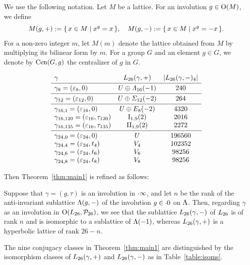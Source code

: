 \documentclass{amsart} %
\begin{document}
\par
%
We use the following notation.
Let $M$ be a lattice.
For an involution $g\in \mathord{\mathrm{O}}(M)$, we define
%
\begin{equation}\label{eq:Mgpm}
M(g, +):=\{\,{x\in M}\mid {x^g=x} \,\},
\quad
M(g, -):=\{\,{x\in M}\mid {x^g=-x} \,\}.
\end{equation}
%
For a non-zero integer $m$,
let $M(m)$ denote the lattice obtained from $M$ by multiplying its bilinear form by
$m$.
For a group $G$ and an element $g\in G$,
we denote by $\mathrm{Cen}(G, g)$ the centralizer of $g$ in $G$.
%
%
\begin{table}
\[
\begin{array}{lc c }
\gamma & \Lts(\gamma, +) & |\Lts(\gamma, -)_4|
\mystrutd{5pt} \\
\hline 
\gamma_{8}=(\vep_8, 0) & U\oplus \Lamsxtn(-1) & 240
\mystruthd{10pt}{5pt} \\
\hline
\gamma_{12}=(\vep_{12}, 0) & U\oplus \Sigmatwlv(-2) & 264
\mystruthd{10pt}{5pt} \\
\hline
\mystruth{10pt}
\gamma_{16, 1}=(\vep_{16}, 0) &U\oplus E_8(-2) &4320\\
\gamma_{16, 120} =(\vep_{16},\tauI) & \typeILat_{1, 9}(2) &2016\\
\gamma_{16, 135} =(\vep_{16},\tauII) & \typeIILat_{1, 9}(2) &2272
\mystrutd{5pt}\\
\hline
\mystruth{10pt}
\gamma_{24, 0}=( \vep_{24}, 0)& U &196560\\
\gamma_{24, 4}=(\vep_{24},t_4)& V_{4} & 102352 \\
\gamma_{24, 6}=( \vep_{24}, t_6) & V_{6} &98256\\
\gamma_{24, 8}=( \vep_{24}, t_8) & V_{8} &98256
\end{array}
\]
\vskip 10pt
\caption{$\Lts(\gamma, +)$ and $\Lts(\gamma,-)$}\label{table:isoms}
\end{table}
%
\par
Then Theorem~\ref{thm:main1} is refined as follows:
%
\begin{theorem}\label{thm:main2}
Suppose that $\gamma=(g, \tau)$ is an involution
in $\cdot \infty$,
and let $n$ be the rank of 
 the anti-invariant sublattice $\Lambda(g, -)$ of the involution $g\in \cdot 0$ on $\Lambda$.
Then,
regarding $\gamma$ as an involution in $\mathord{\mathrm{O}}(L_{26}, \mathord{\mathcal{P}}_{26})$,
we see that 
the sublattice $\Lts(\gamma, -)$ of $L_{26}$ is of rank $n$ and is isomorphic to a sublattice of $\Lambda (-1)$, 
whereas $\Lts(\gamma, +)$ is a hyperbolic lattice of rank $26-n$.
\par
The nine conjugacy classes in Theorem~\ref{thm:main1} are distinguished by 
the isomorphism classes of $\Lts(\gamma, +)$ and $\Lts(\gamma,-)$ as in Table~\ref{table:isoms}.
\end{theorem}
\end{document}
